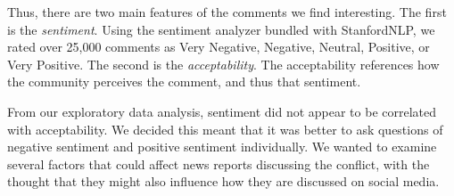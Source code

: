 Thus, there are two main features of the comments we find interesting. The first is the \textit{sentiment}. Using the sentiment analyzer bundled with StanfordNLP\cite{stanfordnlp}, we rated over 25,000 comments as Very Negative, Negative, Neutral, Positive, or Very Positive. The second is the \textit{acceptability}. The acceptability references how the community perceives the comment, and thus that sentiment. 

From our exploratory data analysis, sentiment did not appear to be correlated with acceptability. We decided this meant that it was better to ask questions of negative sentiment and positive sentiment individually. We wanted to examine several factors that could affect news reports discussing the conflict, with the thought that they might also influence how they are discussed on social media.

